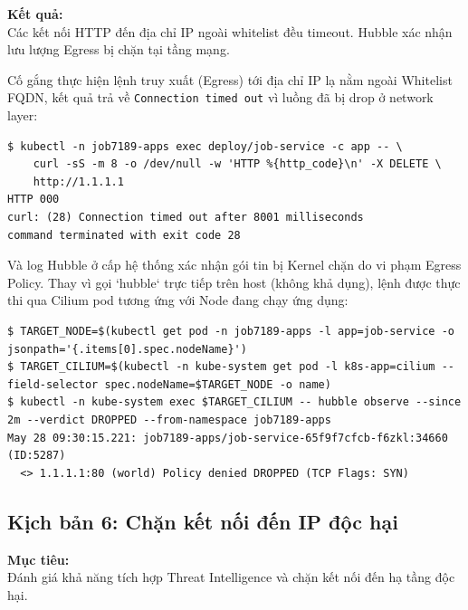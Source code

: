 \textbf{Kết quả:}\\
Các kết nối HTTP đến địa chỉ IP ngoài whitelist đều timeout. Hubble xác nhận lưu lượng Egress bị chặn tại tầng mạng.


Cố gắng thực hiện lệnh truy xuất (Egress) tới địa chỉ IP lạ nằm ngoài Whitelist FQDN, kết quả trả về \texttt{Connection timed out} vì luồng đã bị drop ở network layer:
\begin{listing}[H]
\begin{verbatim}
$ kubectl -n job7189-apps exec deploy/job-service -c app -- \
    curl -sS -m 8 -o /dev/null -w 'HTTP %{http_code}\n' -X DELETE \
    http://1.1.1.1
HTTP 000
curl: (28) Connection timed out after 8001 milliseconds
command terminated with exit code 28
\end{verbatim}
\caption{Lệnh mô phỏng hành vi trích xuất dữ liệu bị chặn gây ra timeout}
\label{lst:kb5_egress_cmd}
\end{listing}

Và log Hubble ở cấp hệ thống xác nhận gói tin bị Kernel chặn do vi phạm Egress Policy. Thay vì gọi `hubble` trực tiếp trên host (không khả dụng), lệnh được thực thi qua Cilium pod tương ứng với Node đang chạy ứng dụng:
\begin{listing}[H]
\begin{verbatim}
$ TARGET_NODE=$(kubectl get pod -n job7189-apps -l app=job-service -o jsonpath='{.items[0].spec.nodeName}')
$ TARGET_CILIUM=$(kubectl -n kube-system get pod -l k8s-app=cilium --field-selector spec.nodeName=$TARGET_NODE -o name)
$ kubectl -n kube-system exec $TARGET_CILIUM -- hubble observe --since 2m --verdict DROPPED --from-namespace job7189-apps
May 28 09:30:15.221: job7189-apps/job-service-65f9f7cfcb-f6zkl:34660 (ID:5287)
  <> 1.1.1.1:80 (world) Policy denied DROPPED (TCP Flags: SYN)
\end{verbatim}
\caption{Kết nối Egress bị Kernel Drop do không nằm trong FQDN Whitelist (được trích xuất từ đúng Cilium Agent)}
\label{lst:kb5_egress_drop}
\end{listing}


\subsection{Kịch bản 6: Chặn kết nối đến IP độc hại}
\label{subsec:kb6_threat_intel}

\textbf{Mục tiêu:}\\
Đánh giá khả năng tích hợp Threat Intelligence và chặn kết nối đến hạ tầng độc hại.

